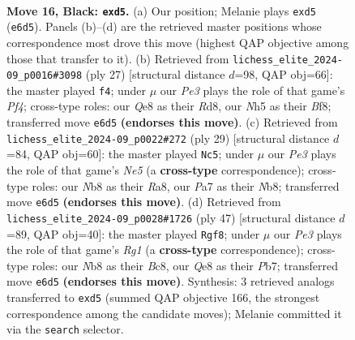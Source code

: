 \documentclass[11pt]{article}
\begin{document}
\clearpage

\begin{figure}[p]\centering
\begin{subfigure}{0.46\textwidth}\centering
\resizebox{\linewidth}{!}{%
\newchessgame
\chessboard[
  setfen={rnb1q1k1/pp2r1pp/2p1p3/3PNp1n/2P5/2B1P1P1/P4PBP/1R1QR1K1 b - - 0 16},
  showmover=false,
  pgfstyle=straightmove, color=movearrow, markmove={e6-d5}
]}
\caption{}
\end{subfigure}\hfill
\begin{subfigure}{0.46\textwidth}\centering
\resizebox{\linewidth}{!}{%
\newchessgame
\chessboard[
  setfen={2kr1bnr/1ppq2p1/p1n3b1/4ppNp/1P5P/P3P1N1/1B1P1PP1/2RQKB1R b K - 1 14},
  showmover=false,
  pgfstyle=straightmove, color=movearrow, markmove={f5-f4}
]}
\caption{}
\end{subfigure}
\\[4pt]
\begin{subfigure}{0.46\textwidth}\centering
\resizebox{\linewidth}{!}{%
\newchessgame
\chessboard[
  setfen={rnb2rk1/1pp1qppp/3p4/pP1Pp3/4n3/5NP1/PB2PPBP/2RQ1RK1 b - - 0 15},
  showmover=false,
  pgfstyle=straightmove, color=movearrow, markmove={e4-c5}
]}
\caption{}
\end{subfigure}\hfill
\begin{subfigure}{0.46\textwidth}\centering
\resizebox{\linewidth}{!}{%
\newchessgame
\chessboard[
  setfen={1kbr2r1/pp3q1p/3pnNp1/2p1n1P1/2P1P2P/1PQ1B3/P3B3/1K1R3R b - - 0 24},
  showmover=false,
  pgfstyle=straightmove, color=movearrow, markmove={g8-f8}
]}
\caption{}
\end{subfigure}
\caption{\textbf{Move 16, Black: \texttt{exd5}.} (a) Our position; Melanie plays \texttt{exd5} (\texttt{e6d5}). Panels (b)--(d) are the retrieved master positions whose correspondence most drove this move (highest QAP objective among those that transfer to it). (b) Retrieved from \texttt{lichess\_elite\_2024-09\_p0016\#3098} (ply 27) [structural distance $d$=98, QAP obj=66]: the master played \texttt{f4}; under $\mu$ our \emph{Pe3} plays the role of that game's \emph{Pf4}; cross-type roles: our \emph{Q}e8 as their \emph{R}d8, our \emph{N}h5 as their \emph{B}f8; transferred move \texttt{e6d5} \textbf{(endorses this move)}. (c) Retrieved from \texttt{lichess\_elite\_2024-09\_p0022\#272} (ply 29) [structural distance $d$=84, QAP obj=60]: the master played \texttt{Nc5}; under $\mu$ our \emph{Pe3} plays the role of that game's \emph{Ne5} (a \textbf{cross-type} correspondence); cross-type roles: our \emph{N}b8 as their \emph{R}a8, our \emph{P}a7 as their \emph{N}b8; transferred move \texttt{e6d5} \textbf{(endorses this move)}. (d) Retrieved from \texttt{lichess\_elite\_2024-09\_p0028\#1726} (ply 47) [structural distance $d$=89, QAP obj=40]: the master played \texttt{Rgf8}; under $\mu$ our \emph{Pe3} plays the role of that game's \emph{Rg1} (a \textbf{cross-type} correspondence); cross-type roles: our \emph{N}b8 as their \emph{B}c8, our \emph{Q}e8 as their \emph{P}b7; transferred move \texttt{e6d5} \textbf{(endorses this move)}. Synthesis: 3 retrieved analogs transferred to \texttt{exd5} (summed QAP objective 166, the strongest correspondence among the candidate moves); Melanie committed it via the \texttt{search} selector.}

\end{figure}
\end{document}
